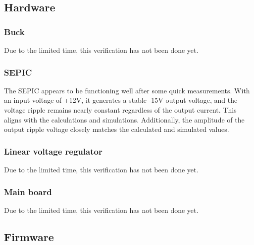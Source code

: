 \subsection{Hardware}

\subsubsection{Buck}
Due to the limited time, this verification has not been done yet.

\subsubsection{SEPIC}
The SEPIC appears to be functioning well after some quick measurements. With an input voltage of +12V, it generates a stable -15V output voltage, and the voltage ripple remains nearly constant regardless of the output current. This aligns with the calculations and simulations. Additionally, the amplitude of the output ripple voltage closely matches the calculated and simulated values.

\subsubsection{Linear voltage regulator}
Due to the limited time, this verification has not been done yet.

\subsubsection{Main board}
Due to the limited time, this verification has not been done yet.

\subsection{Firmware}